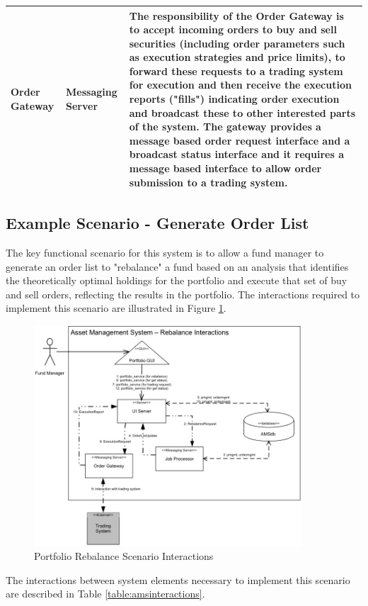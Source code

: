 \begin{table}
\begin{tabular}{| l l p{7cm} |}
Order Gateway      & Messaging Server & The responsibility of the Order Gateway is to accept incoming orders to buy and sell securities (including order parameters such as execution strategies and price limits), to forward these requests to a trading system for execution and then receive the execution reports ("fills") indicating order execution and broadcast these to other interested parts of the system.  The gateway provides a message based order request interface and a broadcast status interface and it requires a message based interface to allow order submission to a trading system.\\
\hline
\end{tabular}
\end{table}

\subsection{Example Scenario - Generate Order List}

  The key functional scenario for this system is to allow a fund manager to generate an order list to "rebalance" a fund based on an analysis that identifies the theoretically optimal holdings for the portfolio and execute that set of buy and sell orders, reflecting the results in the portfolio.  The interactions required to implement this scenario are illustrated in Figure \ref{figure:rebalanceinteractions}. 

\begin{figure}
\centering
\includegraphics[width=10cm]{Figures/adls-figure5}
\caption{Portfolio Rebalance Scenario Interactions}
\label{figure:rebalanceinteractions}
\end{figure}

The interactions between system elements necessary to implement this scenario are described in Table \ref{table:amsinteractions}. 
  
